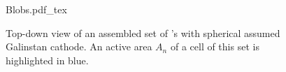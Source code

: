 \documentclass[a4paper,10pt,twocolumn]{article}
\begin{document}
\begin{extract*}
\begin{figure}[H]\centering
	{Blobs.pdf_tex}
	\caption{Top-down view of an assembled set of \BHSC's with spherical assumed Galinstan cathode. An active area $A_n$ of a cell of this set is highlighted in blue. }
	\label{fig:blobs}
\end{figure}

%
%

\end{extract*}
\end{document}
